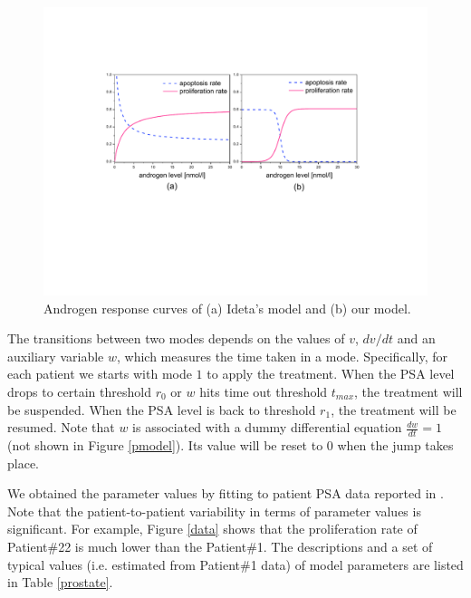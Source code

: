 \begin{figure}[htb]
\centering
\includegraphics[scale=0.45]{fig-response}
\caption{Androgen response curves of (a) Ideta's model and (b) our model.}
\label{response}
\end{figure}



The transitions between two modes depends on the values of $v$, ${dv}/{dt}$ and an auxiliary variable $w$, which measures the time taken in a mode. Specifically, for each patient we starts with mode $1$ to apply the treatment. When the PSA level drops to certain threshold $r_0$ or $w$ hits time out threshold $t_{max}$, the treatment will be suspended. When the PSA level is back to threshold $r_1$, the treatment will be resumed. Note that $w$ is associated with a dummy differential equation $\frac{dw}{dt}=1$ (not shown in Figure \ref{pmodel}). Its value will be reset to $0$ when the jump takes place.  

We obtained the parameter values by fitting to patient PSA data reported in \cite{bruchovsky06, bruchovsky07}. Note that the patient-to-patient variability in terms of parameter values is significant. For example, Figure \ref{data} shows that the proliferation rate of Patient\#22 is much lower than the Patient\#1. The descriptions and a set of typical values (i.e. estimated from Patient\#1 data) of model parameters are listed in Table \ref{prostate}.

